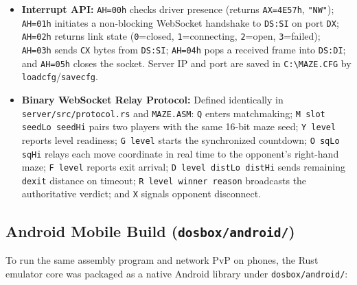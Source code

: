\documentclass[11pt,a4paper]{article}
\begin{document}
\begin{itemize}
    \item \textbf{Interrupt API:} \texttt{AH=00h} checks driver presence (returns \texttt{AX=4E57h}, \texttt{"NW"}); \texttt{AH=01h} initiates a non-blocking WebSocket handshake to \texttt{DS:SI} on port \texttt{DX}; \texttt{AH=02h} returns link state (\texttt{0}=closed, \texttt{1}=connecting, \texttt{2}=open, \texttt{3}=failed); \texttt{AH=03h} sends \texttt{CX} bytes from \texttt{DS:SI}; \texttt{AH=04h} pops a received frame into \texttt{DS:DI}; and \texttt{AH=05h} closes the socket. Server IP and port are saved in \texttt{C:\textbackslash MAZE.CFG} by \texttt{loadcfg}/\texttt{savecfg}.
    \item \textbf{Binary WebSocket Relay Protocol:} Defined identically in \texttt{server/src/protocol.rs} and \texttt{MAZE.ASM}: \texttt{Q} enters matchmaking; \texttt{M slot seedLo seedHi} pairs two players with the same 16-bit maze seed; \texttt{Y level} reports level readiness; \texttt{G level} starts the synchronized countdown; \texttt{O sqLo sqHi} relays each move coordinate in real time to the opponent's right-hand maze; \texttt{F level} reports exit arrival; \texttt{D level distLo distHi} sends remaining \texttt{dexit} distance on timeout; \texttt{R level winner reason} broadcasts the authoritative verdict; and \texttt{X} signals opponent disconnect.
\end{itemize}

\subsection{Android Mobile Build (\texttt{dosbox/android/})}
To run the same assembly program and network PvP on phones, the Rust emulator core was packaged as a native Android library under \texttt{dosbox/android/}:
\end{document}
